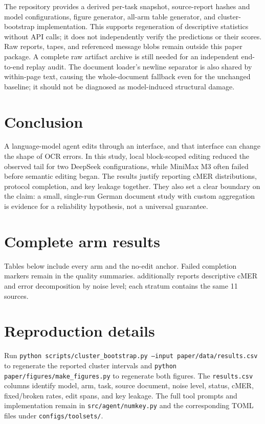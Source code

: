 \documentclass{article}
\begin{document}
The repository provides a derived per-task snapshot, source-report hashes and model configurations, figure generator, all-arm table generator, and cluster-bootstrap implementation. This supports regeneration of descriptive statistics without API calls; it does not independently verify the predictions or their scores. Raw reports, tapes, and referenced message blobs remain outside this paper package. A complete raw artifact archive is still needed for an independent end-to-end replay audit. The document loader's newline separator is also shared by within-page text, causing the whole-document fallback even for the unchanged baseline; it should not be diagnosed as model-induced structural damage.

\section{Conclusion}
A language-model agent edits through an interface, and that interface can change the shape of OCR errors. In this study, local block-scoped editing reduced the observed tail for two DeepSeek configurations, while MiniMax M3 often failed before semantic editing began. The results justify reporting cMER distributions, protocol completion, and key leakage together. They also set a clear boundary on the claim: a small, single-run German document study with custom aggregation is evidence for a reliability hypothesis, not a universal guarantee.




\appendix
\section{Complete arm results}
Tables below include every arm and the no-edit anchor. Failed completion markers remain in the quality summaries.  additionally reports descriptive cMER and error decomposition by noise level; each stratum contains the same 11 sources.

\clearpage
\section{Reproduction details}
Run \texttt{python scripts/cluster\_bootstrap.py --input paper/data/results.csv} to regenerate the reported cluster intervals and \texttt{python paper/figures/make\_figures.py} to regenerate both figures. The \texttt{results.csv} columns identify model, arm, task, source document, noise level, status, cMER, fixed/broken rates, edit spans, and key leakage. The full tool prompts and implementation remain in \texttt{src/agent/numkey.py} and the corresponding TOML files under \texttt{configs/toolsets/}.
\end{document}
